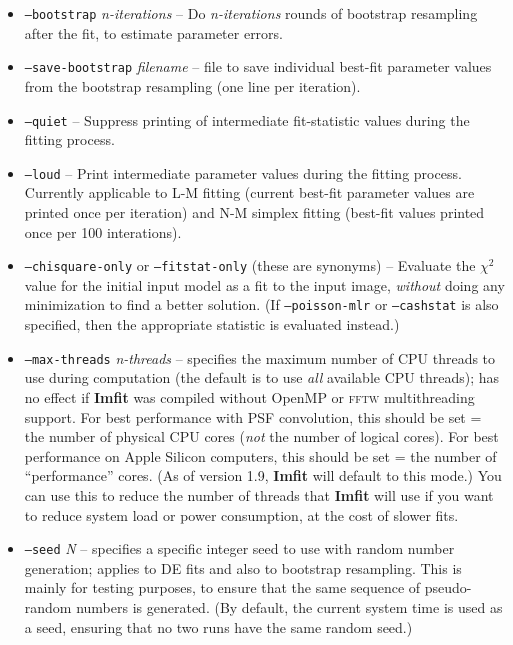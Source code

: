 \documentclass[10pt,a4paper,article]{memoir}
\newcommand{\imfit}{\textbf{Imfit}}
\newcommand{\Imfit}{\textbf{Imfit}}
\newcommand{\chisquare}{\ensuremath{\chi^{2}}}
\begin{document}
\begin{itemize}
\bigskip

\item \texttt{--bootstrap} \textit{n-iterations} -- Do \textit{n-iterations} rounds
of bootstrap resampling after the fit, to estimate parameter errors.

\item \texttt{--save-bootstrap} \textit{filename} -- file to save
individual best-fit parameter values from the bootstrap resampling (one
line per iteration).

\bigskip

\item \texttt{--quiet} -- Suppress printing of intermediate fit-statistic values
during the fitting process.

\item \texttt{--loud} -- Print intermediate parameter values during the fitting
process. Currently applicable to L-M fitting (current best-fit parameter values are
printed once per iteration) and N-M simplex fitting (best-fit values printed once per 100 interations).

\bigskip

\item \texttt{--chisquare-only} or \texttt{--fitstat-only} (these are
synonyms) -- Evaluate the \chisquare{} value for the initial input model
as a fit to the input image, \textit{without} doing any minimization to
find a better solution. (If \texttt{--poisson-mlr} or
\texttt{--cashstat} is also specified, then the appropriate statistic is
evaluated instead.)

\bigskip

\item \texttt{--max-threads} \textit{n-threads} -- specifies the maximum
number of CPU threads to use during computation (the default is to use
\textit{all} available CPU threads); has no effect if \imfit{} was
compiled without OpenMP or \textsc{fftw} multithreading support. For
best performance with PSF convolution, this should be set = the number
of physical CPU cores (\textit{not} the number of logical cores). For
best performance on Apple Silicon computers, this should be set = the
number of ``performance'' cores. (As of version 1.9, \Imfit{} will
default to this mode.) You can use this to reduce the number of threads
that \Imfit{} will use if you want to reduce system load or power consumption,
at the cost of slower fits.

\item \texttt{--seed} \textit{N} -- specifies a specific integer seed to use with
random number generation; applies to DE fits and also to bootstrap resampling. This is
mainly for testing purposes, to ensure that the same sequence of pseudo-random
numbers is generated. (By default, the current system time is used as a seed,
ensuring that no two runs have the same random seed.)


\end{itemize}
\end{document}
